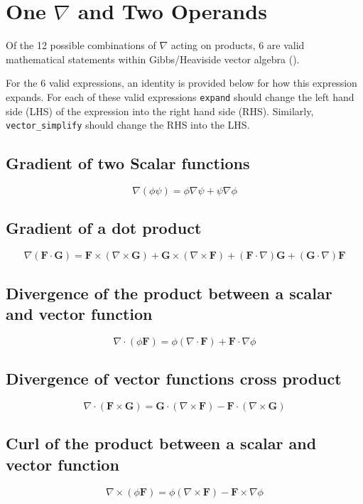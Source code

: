 \documentclass[12pt, titlepage]{article}
\newcommand{\code}[1]{\texttt{#1}}
\begin{document}
	\section{One \(\nabla\) and Two Operands}
	Of the 12 possible combinations of \(\nabla\) acting on products, 6 are valid mathematical statements within Gibbs/Heaviside vector algebra (\cite{Lopez}).
	
	For the 6 valid expressions, an identity is provided below for how this expression expands.  For each of these valid expressions \code{expand} should change the left hand side (LHS) of the expression into the right hand side (RHS). Similarly,  \code{vector\_simplify} should change the RHS into the LHS.
	
	\subsection{Gradient of two Scalar functions}
	\[
	\nabla (\phi \psi)=\phi\nabla \psi + \psi \nabla \phi
	\]
	
	\subsection{Gradient of a dot product}
	\[
	\nabla ({\mathbf{F}}\cdot {\mathbf{G}})={\mathbf{F}}\times (\nabla \times {\mathbf{G}})+{\mathbf{G}}\times (\nabla \times {\mathbf{F}})+({\mathbf{F}}\cdot \nabla ){\mathbf{G}}+({\mathbf{G}}\cdot \nabla ){\mathbf{F}}
	\]
	
	\subsection{Divergence of the product between a scalar and vector function}
	\[
	\nabla \cdot (\phi {\mathbf{F}})=\phi(\nabla \cdot {\mathbf{F}})+{\mathbf{F}}\cdot \nabla \phi
	\]
	
	\subsection{Divergence of vector functions cross product}
	\[
	\nabla \cdot ({\mathbf{F}}\times {\mathbf{G}})={\mathbf{G}}\cdot (\nabla \times {\mathbf{F}})-{\mathbf{F}}\cdot (\nabla \times {\mathbf{G}})
	\]
	
	\subsection{Curl of the product between a scalar and vector function}
	\[
	\nabla \times (\phi{\mathbf{F}}) =\phi(\nabla \times {\mathbf{F}}) - {\mathbf{F}} \times \nabla \phi
	\]
	
\end{document}
